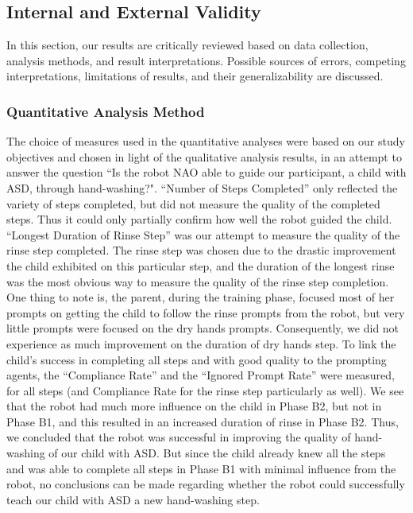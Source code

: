 \subsection{Internal and External Validity}
In this section, our results are critically reviewed based on data collection, analysis methods, and result interpretations.  Possible sources of errors, competing interpretations, limitations of results, and their generalizability are discussed.

\subsubsection{Quantitative Analysis Method}
The choice of measures used in the quantitative analyses were based on our study objectives and chosen in light of the qualitative analysis results, in an attempt to answer the question ``Is the robot NAO able to guide our participant, a child with ASD, through hand-washing?".  ``Number of Steps Completed'' only reflected the variety of steps completed, but did not measure the quality of the completed steps.  Thus it could only partially confirm how well the robot guided the child.  ``Longest Duration of Rinse Step'' was our attempt to measure the quality of the rinse step completed.  The rinse step was chosen due to the drastic improvement the child exhibited on this particular step, and the duration of the longest rinse was the most obvious way to measure the quality of the rinse step completion.  One thing to note is, the parent, during the training phase, focused most of her prompts on getting the child to follow the rinse prompts from the robot, but very little prompts were focused on the dry hands prompts.  Consequently, we did not experience as much improvement on the duration of dry hands step.  To link the child's success in completing all steps and with good quality to the prompting agents, the ``Compliance Rate'' and the ``Ignored Prompt Rate'' were measured, for all steps (and Compliance Rate for the rinse step particularly as well).  We see that the robot had much more influence on the child in Phase B2, but not in Phase B1, and this resulted in an increased duration of rinse in Phase B2.  Thus, we concluded that the robot was successful in improving the quality of hand-washing of our child with ASD.  But since the child already knew all the steps and was able to complete all steps in Phase B1 with minimal influence from the robot, no conclusions can be made regarding whether the robot could successfully teach our child with ASD a new hand-washing step.

